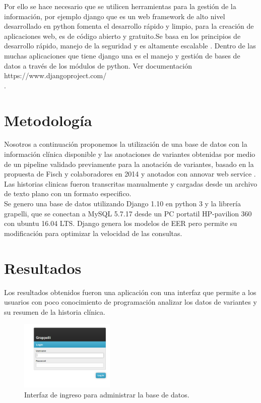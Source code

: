 Por ello se hace necesario que se utilicen herramientas para la gestión de la información, por ejemplo django que es un web framework de alto nivel desarrollado en python  fomenta el desarrollo rápido y limpio, para la creación de aplicaciones web, es de código abierto y gratuito.Se basa en los principios de desarrollo rápido, manejo de la seguridad y es altamente escalable . Dentro de las muchas aplicaciones que tiene django una es el manejo y gestión de bases de datos a través de los módulos de python. Ver documentación https://www.djangoproject.com/ \\.


\section{Metodología}

Nosotros a continuación proponemos la utilización de una base de datos con la información clínica disponible y las anotaciones de variantes obtenidas por medio de un pipeline validado previamente para la anotación de variantes, basado en la propuesta de Fisch y colaboradores en 2014 \cite{Fisch2015} y anotados con annovar web service \cite{Yang2015}. Las historias clinicas fueron transcritas manualmente y cargadas desde un archivo de texto plano con un formato especifico.\\

Se genero una base de datos utilizando Django 1.10 en python 3 y la librería grapelli, que se conectan  a  MySQL  5.7.17 desde un PC portatil HP-pavilion 360 con ubuntu 16.04 LTS. Django genera los modelos de EER pero permite su modificación para optimizar la velocidad de las consultas. \\

\section{Resultados} 

Los resultados obtenidos fueron una aplicación con una interfaz que permite a los usuarios con poco conocimiento de  programación  analizar los datos de variantes y su resumen de la historia clínica. \\

\begin{figure}[h] 
	\centering
	\includegraphics[width=0.4\textwidth]{Kap3/admin_django}
	\caption{Interfaz de ingreso para  administrar la base de datos.} \label{fig:admin}
\end{figure}

